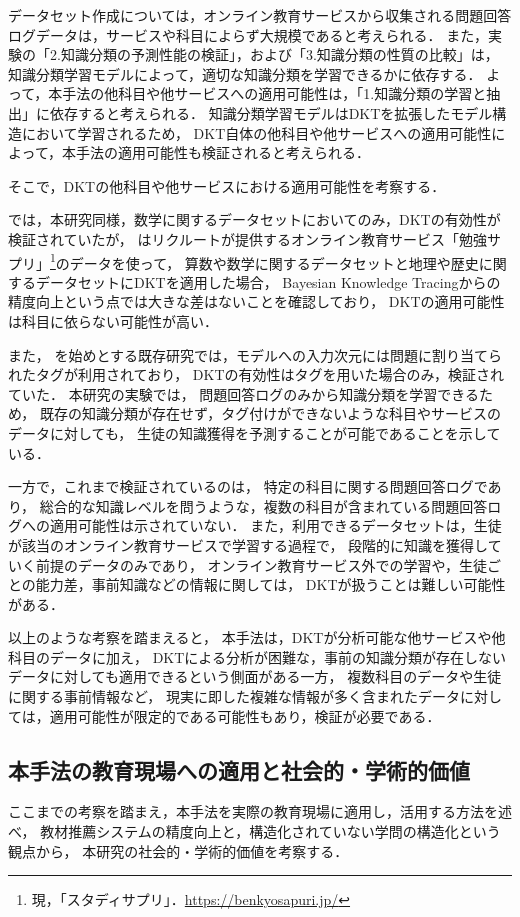 データセット作成については，オンライン教育サービスから収集される問題回答ログデータは，サービスや科目によらず大規模であると考えられる．
また，実験の「2.知識分類の予測性能の検証」，および「3.知識分類の性質の比較」は，
知識分類学習モデルによって，適切な知識分類を学習できるかに依存する．
よって，本手法の他科目や他サービスへの適用可能性は，「1.知識分類の学習と抽出」に依存すると考えられる．
知識分類学習モデルはDKTを拡張したモデル構造において学習されるため，
DKT自体の他科目や他サービスへの適用可能性によって，本手法の適用可能性も検証されると考えられる．


そこで，DKTの他科目や他サービスにおける適用可能性を考察する．

\cite{piech2015deep}では，本研究同様，数学に関するデータセットにおいてのみ，DKTの有効性が検証されていたが，
\cite{nasuno2016深層学習}はリクルートが提供するオンライン教育サービス「勉強サプリ」\footnote{現，「スタディサプリ」．\url{https://benkyosapuri.jp/}}のデータを使って，
算数や数学に関するデータセットと地理や歴史に関するデータセットにDKTを適用した場合，
Bayesian Knowledge Tracingからの精度向上という点では大きな差はないことを確認しており，
DKTの適用可能性は科目に依らない可能性が高い．

また，
\cite{piech2015deep}を始めとする既存研究では，モデルへの入力次元には問題に割り当てられたタグが利用されており，
DKTの有効性はタグを用いた場合のみ，検証されていた．
本研究の実験では，
問題回答ログのみから知識分類を学習できるため，
既存の知識分類が存在せず，タグ付けができないような科目やサービスのデータに対しても，
生徒の知識獲得を予測することが可能であることを示している．


一方で，これまで検証されているのは，
特定の科目に関する問題回答ログであり，
総合的な知識レベルを問うような，複数の科目が含まれている問題回答ログへの適用可能性は示されていない．
また，利用できるデータセットは，生徒が該当のオンライン教育サービスで学習する過程で，
段階的に知識を獲得していく前提のデータのみであり，
オンライン教育サービス外での学習や，生徒ごとの能力差，事前知識などの情報に関しては，
DKTが扱うことは難しい可能性がある．


以上のような考察を踏まえると，
本手法は，DKTが分析可能な他サービスや他科目のデータに加え，
DKTによる分析が困難な，事前の知識分類が存在しないデータに対しても適用できるという側面がある一方，
複数科目のデータや生徒に関する事前情報など，
現実に即した複雑な情報が多く含まれたデータに対しては，適用可能性が限定的である可能性もあり，検証が必要である．


\subsection{本手法の教育現場への適用と社会的・学術的価値}
ここまでの考察を踏まえ，本手法を実際の教育現場に適用し，活用する方法を述べ，
教材推薦システムの精度向上と，構造化されていない学問の構造化という観点から，
本研究の社会的・学術的価値を考察する．


